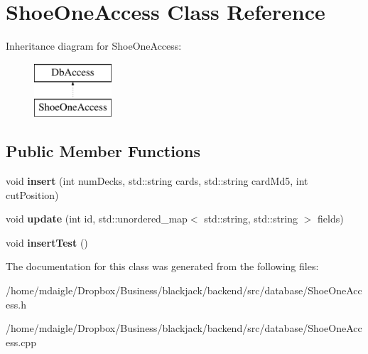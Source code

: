 \hypertarget{classShoeOneAccess}{
\section{\-Shoe\-One\-Access \-Class \-Reference}
\label{d0/d64/classShoeOneAccess}
}
\-Inheritance diagram for \-Shoe\-One\-Access\-:\begin{figure}[H]
\begin{center}
\leavevmode
\includegraphics[height=2.000000cm]{d0/d64/classShoeOneAccess}
\end{center}
\end{figure}
\subsection*{\-Public \-Member \-Functions}
\begin{DoxyCompactItemize}
\item 
\hypertarget{classShoeOneAccess_a8454b1ca028aad04c17d5d329b42ec8e}{
void {\bfseries insert} (int num\-Decks, std\-::string cards, std\-::string card\-Md5, int cut\-Position)}
\label{d0/d64/classShoeOneAccess_a8454b1ca028aad04c17d5d329b42ec8e}

\item 
\hypertarget{classShoeOneAccess_a26c0d9be2f868e8f5854f7c1fd3814a0}{
void {\bfseries update} (int id, std\-::unordered\-\_\-map$<$ std\-::string, std\-::string $>$ fields)}
\label{d0/d64/classShoeOneAccess_a26c0d9be2f868e8f5854f7c1fd3814a0}

\item 
\hypertarget{classShoeOneAccess_ae1e2165c39ba782041b39a4b665d76c5}{
void {\bfseries insert\-Test} ()}
\label{d0/d64/classShoeOneAccess_ae1e2165c39ba782041b39a4b665d76c5}

\end{DoxyCompactItemize}


\-The documentation for this class was generated from the following files\-:\begin{DoxyCompactItemize}
\item 
/home/mdaigle/\-Dropbox/\-Business/blackjack/backend/src/database/\-Shoe\-One\-Access.\-h\item 
/home/mdaigle/\-Dropbox/\-Business/blackjack/backend/src/database/\-Shoe\-One\-Access.\-cpp\end{DoxyCompactItemize}
